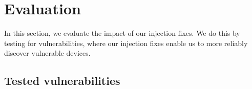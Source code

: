 \documentclass[sigconf]{acmart}
\newcommand{\red}[1]{\textcolor{red}{#1}}
\begin{document}






\section{Evaluation}
\label{sec:evaluation}

In this section, we evaluate the impact of our injection fixes.
We do this by testing for vulnerabilities, where our injection fixes enable us to more reliably discover vulnerable devices.

\subsection{Tested vulnerabilities}
\end{document}
